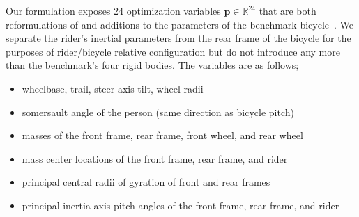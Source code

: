 \documentclass{bmd2019a}
\begin{document}
Our formulation exposes 24 optimization variables
$\mathbf{p}\in\mathbb{R}^{24}$ that are both reformulations of and additions to
the parameters of the benchmark bicycle~\cite{Meijaard2007}. We separate the
rider's inertial parameters from the rear frame of the bicycle for the purposes
of rider/bicycle relative configuration but do not introduce any more than the
benchmark's four rigid bodies. The variables are as follows;
%
\begin{itemize}
  \itemsep-0.25em
  \item wheelbase, trail, steer axis tilt, wheel radii
  \item somersault angle of the person (same direction as bicycle pitch)
  \item masses of the front frame, rear frame, front wheel, and rear wheel
  \item mass center locations of the front frame, rear frame, and rider
  \item principal central radii of gyration of front and rear frames
  \item principal inertia axis pitch angles of the front frame, rear frame, and rider
\end{itemize}
\end{document}
